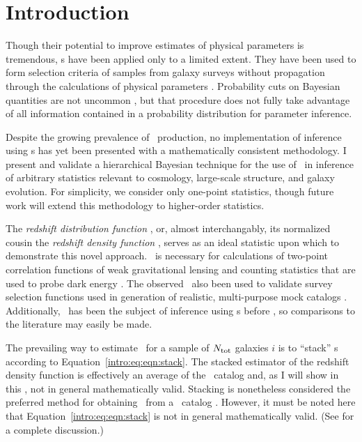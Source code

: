 \section{Introduction}

Though their potential to improve estimates of physical parameters is tremendous, \pzpdf s have been applied only to a limited extent.  
They have been used to form selection criteria of samples from galaxy surveys without propagation 
through the calculations of physical parameters \citep{VanBreukelen2009,Viironen2015}.  
Probability cuts on Bayesian quantities are not uncommon \citep{Leung2015, DiPompeo2015a}, but that procedure does not fully take advantage of all information contained in a probability distribution for parameter inference.  

Despite the growing prevalence of \pzpdf\ production, no implementation of inference using \pzpdf s has yet been presented with a mathematically consistent methodology.  
I present and validate a hierarchical Bayesian technique for the use of \pzpdf\ in inference of arbitrary statistics relevant to cosmology, large-scale structure, and galaxy evolution.  
For simplicity, we consider only one-point statistics, though future work will extend this methodology to higher-order statistics.

The \textit{redshift distribution function \Nz}, or, almost interchangably, its normalized cousin the \textit{redshift density function \nz}, serves as an ideal statistic upon which to demonstrate this novel approach.  
\Nz\ is necessary for calculations of two-point correlation functions of weak gravitational lensing and counting statistics that are used to probe dark energy \citep{Masters2015}.  
The observed \Nz\ also been used to validate survey selection functions used in generation of realistic, multi-purpose mock catalogs \citep{Norberg2002}.  
Additionally, \Nz\ has been the subject of inference using \pzpdf s before \citep{Sheldon2012, Hildebrandt2012, Kelly2014, Benjamin2013, Bonnett2015a, Viironen2015, Asorey2016, Leistedt2016}, so comparisons to the literature may easily be made. 

The prevailing way to estimate \nz\ for a sample of $N_{\mathrm{tot}}$ galaxies $i$ is to ``stack'' \pzpdf s according to Equation~\ref{intro:eq:eqn:stack}.
The stacked estimator of the redshift density function is effectively an average of the \pzpdf\ catalog and, as I will show in this \paper, not in general mathematically valid.
Stacking is nonetheless considered the preferred method for obtaining \Nz\ from a \pzpdf\ catalog \citep{Sheldon2012, Kelly2014, Benjamin2013, Bonnett2015a, Viironen2015, Asorey2016}.  
However, it must be noted here that Equation~\ref{intro:eq:eqn:stack} is not in general mathematically valid.  
(See \citet{Hogg2012} for a complete discussion.)  

